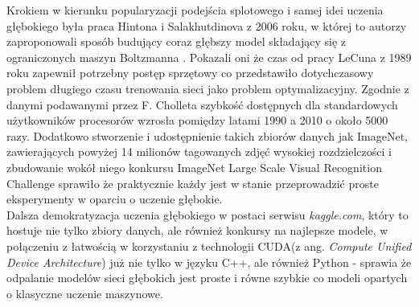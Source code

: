 Krokiem w kierunku popularyzacji podejścia splotowego i samej idei uczenia głębokiego była praca Hintona i Salakhutdinova z 2006 roku, w której to autorzy zaproponowali sposób budujący coraz głębszy model składający
się z ograniczonych maszyn Boltzmanna \cite{hinton}. Pokazali oni że czas od pracy LeCuna z 1989 roku \cite{lecun} zapewnił potrzebny postęp sprzętowy co przedstawiło dotychczasowy problem długiego czasu trenowania sieci jako problem optymalizacyjny. Zgodnie z danymi podawanymi przez F. Cholleta \cite{deep} szybkość dostępnych dla standardowych użytkowników procesorów wzrosła pomiędzy latami 1990 a 2010 o około 5000 razy. Dodatkowo stworzenie i udostępnienie takich zbiorów danych jak ImageNet, zawierających powyżej 14 milionów tagowanych zdjęć wysokiej rozdzielczości i zbudowanie wokół niego konkursu ImageNet Large Scale Visual Recognition Challenge \cite{imagenet} sprawiło że praktycznie każdy jest w stanie przeprowadzić proste eksperymenty w oparciu o uczenie głębokie. \\

Dalsza demokratyzacja uczenia głębokiego w postaci serwisu \textit{kaggle.com}, który to hostuje nie tylko zbiory danych, ale również konkursy na najlepsze modele, w połączeniu z łatwością w korzystaniu z technologii CUDA(z ang. \textit{Compute Unified Device Architecture}) już nie tylko w języku C++, ale również Python - sprawia że odpalanie modelów sieci głębokich jest proste i równe szybkie co modeli opartych o klasyczne uczenie maszynowe\cite{deep}.

























